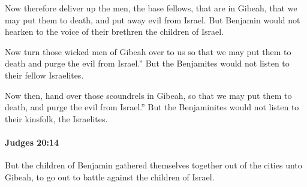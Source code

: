 			\begin{versebox}
					\item[BHS] 
					\item[ASV] Now therefore deliver up the men, the base fellows, that are in Gibeah, that we may put them to death, and put away evil from Israel. But Benjamin would not hearken to the voice of their brethren the children of Israel.
					\item[NIV] Now turn those wicked men of Gibeah over to us so that we may put them to death and purge the evil from Israel.” But the Benjamites would not listen to their fellow Israelites.
					\item[NRSV] Now then, hand over those scoundrels in Gibeah, so that we may put them to death, and purge the evil from Israel.” But the Benjaminites would not listen to their kinsfolk, the Israelites.
			\end{versebox}

		\paragraph{Judges 20:14} %
			\label{JUDGES-20-14}

			But the children of Benjamin gathered themselves together out of the cities unto Gibeah, to go out to battle against the children of Israel.

